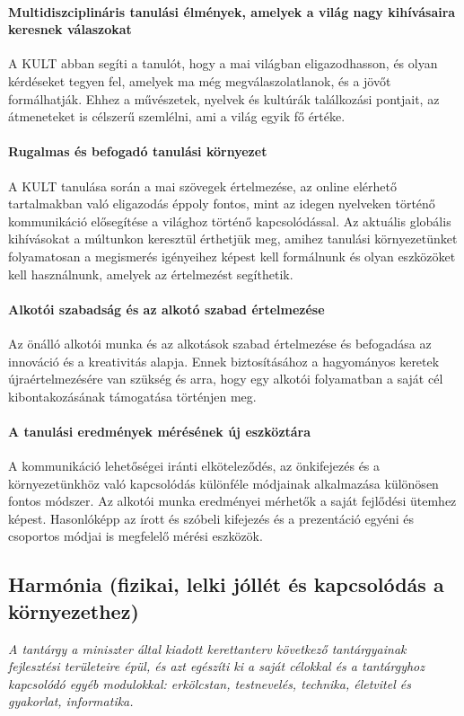 \paragraph{Multidiszciplináris tanulási élmények, amelyek a világ nagy kihívásaira keresnek válaszokat}

A KULT abban segíti a tanulót,  hogy a mai világban eligazodhasson, és olyan kérdéseket tegyen fel, amelyek ma még megválaszolatlanok, és a jövőt formálhatják. Ehhez a művészetek, nyelvek és kultúrák találkozási pontjait, az átmeneteket is célszerű szemlélni, ami a világ egyik fő értéke.

\paragraph{Rugalmas és befogadó tanulási környezet}

A KULT tanulása során a mai szövegek értelmezése, az online elérhető tartalmakban való eligazodás éppoly fontos, mint az idegen nyelveken történő kommunikáció elősegítése a világhoz történő kapcsolódással. Az aktuális globális kihívásokat a múltunkon keresztül érthetjük meg, amihez tanulási környezetünket folyamatosan a megismerés igényeihez képest kell formálnunk és olyan eszközöket kell használnunk, amelyek az értelmezést segíthetik.

\paragraph{Alkotói szabadság és az alkotó szabad értelmezése}

Az önálló alkotói munka és az alkotások szabad értelmezése és befogadása az innováció és a kreativitás alapja. Ennek biztosításához a hagyományos keretek újraértelmezésére van szükség és arra, hogy egy alkotói folyamatban a saját cél kibontakozásának támogatása történjen meg.

\paragraph{A tanulási eredmények mérésének új eszköztára}

A kommunikáció lehetőségei iránti elköteleződés, az önkifejezés és a környezetünkhöz való kapcsolódás különféle módjainak alkalmazása különösen fontos módszer. Az alkotói munka eredményei mérhetők a saját fejlődési ütemhez képest. Hasonlóképp az írott és szóbeli kifejezés és a prezentáció egyéni és csoportos módjai is megfelelő mérési eszközök.

\subsection[Harmónia]{Harmónia (fizikai, lelki jóllét és kapcsolódás a környezethez)}
\emph{A tantárgy a miniszter által kiadott kerettanterv következő tantárgyainak fejlesztési területeire épül, és azt egészíti ki a saját célokkal és a tantárgyhoz kapcsolódó egyéb modulokkal: erkölcstan, testnevelés, technika, életvitel és gyakorlat, informatika.}

